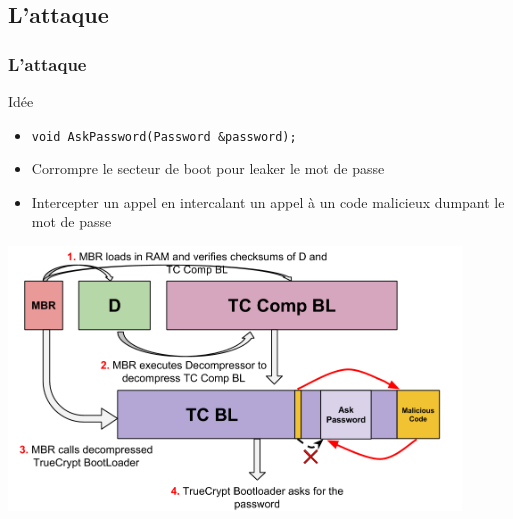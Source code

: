 \documentclass[red]{beamer}
\begin{document}
\subsection{L'attaque}
\begin{frame}
    \frametitle{L'attaque}
    \begin{block}{Idée}
        \begin{itemize}
            \item \texttt{void AskPassword(Password \&password);}
            \item Corrompre le secteur de boot pour leaker le mot de
            passe
            \item Intercepter un appel en intercalant un appel à un
            code malicieux dumpant le mot de passe
        \end{itemize}
    \end{block}
\end{frame}

\begin{frame}
    \begin{center}
        \includegraphics[width=0.9\textwidth]{img/tc_boot_min.png}
    \end{center}
\end{frame}
\end{document}
